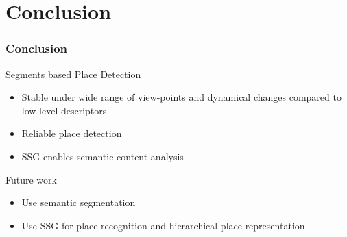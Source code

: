 \section{Conclusion}
\frame
{
	\frametitle{Conclusion}
	
	\begin{block}{Segments based Place Detection}
		\begin{itemize}
			\item Stable under wide range of view-points and dynamical changes compared to low-level descriptors
			\item Reliable place detection
			\item SSG enables semantic content analysis
		\end{itemize}
	\end{block}	
	
	\begin{block}{Future work}
		\begin{itemize}
			\item Use semantic segmentation
			\item Use SSG for place recognition and hierarchical place representation
		\end{itemize}
	\end{block}	
	
}